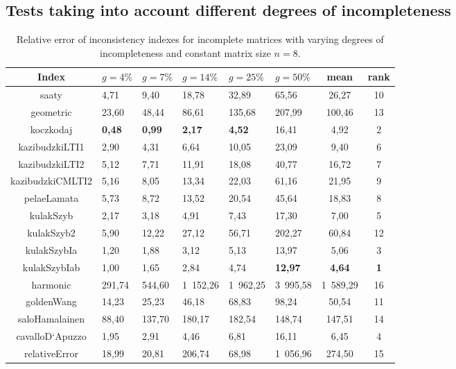\subsection{Tests taking into account different degrees of incompleteness}
\begin{table}[h]
\begin{center}
\caption{Relative error of inconsistency indexes for incomplete matrices with varying degrees of incompleteness and constant matrix size $n=8$.}
\label{tab:results1}
\begin{tabular}{|c||l|l|l|l|l|c||c|}
\hline Index & $g=4\%$ & $g=7\%$ & $g=14\%$ & $g=25\%$ & $g=50\%$ & mean & rank \\ \hline \hline
saaty & 4,71 & 9,40 & 18,78 & 32,89 & 65,56 & 26,27 & 10 \\ \hline
geometric & 23,60 & 48,44 & 86,61 & 135,68 & 207,99 & 100,46  & 13 \\ \hline
koczkodaj & \textbf{0,48} & \textbf{0,99} & \textbf{2,17} & \textbf{4,52} & 16,41 & 4,92 & 2 \\ \hline
kazibudzkiLTI1 & 2,90 & 4,31 & 6,64 & 10,05 & 23,09 & 9,40 & 6 \\ \hline
kazibudzkiLTI2 & 5,12 & 7,71 & 11,91 & 18,08 & 40,77 & 16,72 & 7 \\ \hline
kazibudzkiCMLTI2 & 5,16 & 8,05 & 13,34 & 22,03 & 61,16 & 21,95 & 9 \\ \hline
pelaeLamata & 5,73 & 8,72 & 13,52 & 20,54 & 45,64 & 18,83 & 8 \\ \hline
kulakSzyb & 2,17 & 3,18 & 4,91 & 7,43 & 17,30 & 7,00 & 5 \\ \hline
kulakSzyb2 & 5,90 & 12,22 & 27,12 & 56,71 & 202,27 & 60,84 & 12 \\ \hline
kulakSzybIa & 1,20 & 1,88 & 3,12 & 5,13 & 13,97 & 5,06 & 3 \\ \hline
kulakSzybIab & 1,00 & 1,65 & 2,84 & 4,74 & \textbf{12,97} & \textbf{4,64} & \textbf{1} \\ \hline
harmonic & 291,74 & 544,60 & 1 152,26 & 1 962,25 & 3 995,58 & 1 589,29 & 16 \\ \hline
goldenWang & 14,23 & 25,23 & 46,18 & 68,83 & 98,24 & 50,54 & 11 \\ \hline
saloHamalainen & 88,40 & 137,70 & 180,17 & 182,54 & 148,74 & 147,51 & 14 \\ \hline
cavalloD`Apuzzo & 1,95 & 2,91 & 4,46 & 6,81 & 16,11 & 6,45 & 4 \\ \hline
relativeError & 18,99 & 20,81 & 206,74 & 68,98 & 1 056,96 & 274,50 & 15 \\ \hline
\end{tabular}
\end{center}
\end{table}

